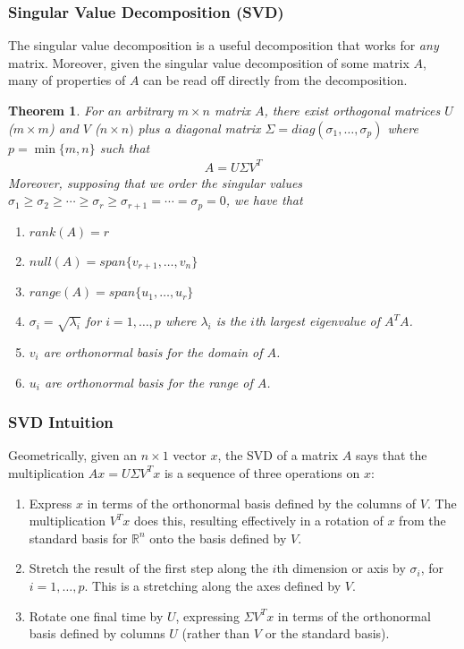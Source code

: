 \documentclass[12pt]{article}
\numberwithin{equation}{section} %
\theoremstyle{plain}
\newtheorem{thm}{Theorem}[section]
\theoremstyle{definition}
\theoremstyle{remark}
\begin{document}
\subsubsection{Singular Value Decomposition (SVD)}

The singular value decomposition is a useful decomposition that works
for \emph{any} matrix. Moreover, given the singular value decomposition
of some matrix $A$, many of properties of $A$ can be read off directly
from the decomposition.

\begin{thm}
For an arbitrary $m\times n$ matrix $A$, there exist orthogonal matrices
$U$ ($m\times m$) and $V$ ($n\times n)$ plus a diagonal matrix
$\Sigma=diag(\sigma_1, \ldots,\sigma_p)$ where $p=\min\{m,n\}$ such
that
\begin{align*}
  A = U\Sigma V^T
\end{align*}
Moreover, supposing that we order the singular values $\sigma_1 \geq
\sigma_2\geq\cdots\geq \sigma_r\geq \sigma_{r+1}=\cdots = \sigma_p=0$,
we have that
\begin{enumerate}
\item $rank(A)=r$
\item $null(A)=span\{v_{r+1},\ldots,v_n\}$
\item $range(A)=span\{u_{1},\ldots,u_r\}$
\item $\sigma_i = \sqrt{\lambda_i}$ for $i=1,\ldots,p$ where $\lambda_i$
  is the $i$th largest eigenvalue of $A^TA$.
\item $v_i$ are orthonormal basis for the domain of $A$.
\item $u_i$ are orthonormal basis for the range of $A$.
\end{enumerate}
\end{thm}

\subsubsection{SVD Intuition}

Geometrically, given an $n\times 1$ vector $x$, the SVD of a matrix $A$
says that the multiplication $Ax = U\Sigma V^T x$ is a sequence of three
operations on $x$:
\begin{enumerate}
\item Express $x$ in terms of the orthonormal basis defined by the
  columns of $V$. The multiplication $V^T x$ does this, resulting
  effectively in a rotation of $x$ from the standard basis for
  $\mathbb{R}^n$ onto the basis defined by $V$.
\item Stretch the result of the first step along the $i$th dimension or
  axis by $\sigma_i$, for $i=1,\ldots,p$. This is a stretching along the
  axes defined by $V$.
\item Rotate one final time by $U$, expressing $\Sigma V^Tx$ in terms of
  the orthonormal basis defined by columns $U$ (rather than $V$ or the
  standard basis).
\end{enumerate}
\end{document}
